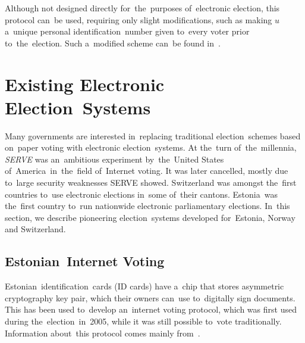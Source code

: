Although not designed directly for~the~purposes of~electronic election, this protocol can~be used, requiring only slight modifications, such as making $u$ a~unique personal identification~number given to~every voter prior to~the~election. Such a~modified scheme can~be found in~\cite{Radwin}.
\section{Existing Electronic Election~Systems}
Many governments are interested in~replacing traditional election~schemes based on~paper voting with electronic election~systems. At the~turn of~the~millennia, \emph{SERVE} was an~ambitious experiment by~the~United States of~America~in~the~field of~Internet voting. It was later cancelled, mostly due to~large security weaknesses SERVE showed. Switzerland was amongst the~first countries to~use electronic elections in~some of~their cantons. Estonia~was the~first country to~run nationwide electronic parliamentary elections. In~this section, we describe pioneering election~systems developed for~Estonia, Norway and Switzerland.

\subsection{Estonian~Internet Voting}
Estonian~identification~cards (ID cards) have a~chip that stores asymmetric cryptography key pair, which their owners can~use to~digitally sign documents. This has been used to~develop an~internet voting protocol, which was first used during the~election~in~2005, while it was still possible to~vote traditionally. Information about~this protocol comes mainly from~\cite{Springall}. %

